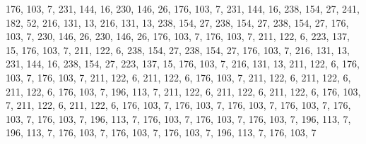 176, 103, 7, 231, 144, 16, 230, 146, 26, 176, 103, 7, 231, 144, 16, 238,
154, 27, 241, 182, 52, 216, 131, 13, 216, 131, 13, 238, 154, 27, 238, 154,
27, 238, 154, 27, 176, 103, 7, 230, 146, 26, 230, 146, 26, 176, 103, 7,
176, 103, 7, 211, 122, 6, 223, 137, 15, 176, 103, 7, 211, 122, 6, 238,
154, 27, 238, 154, 27, 176, 103, 7, 216, 131, 13, 231, 144, 16, 238, 154,
27, 223, 137, 15, 176, 103, 7, 216, 131, 13, 211, 122, 6, 176, 103, 7,
176, 103, 7, 211, 122, 6, 211, 122, 6, 176, 103, 7, 211, 122, 6, 211,
122, 6, 211, 122, 6, 176, 103, 7, 196, 113, 7, 211, 122, 6, 211, 122,
6, 211, 122, 6, 176, 103, 7, 211, 122, 6, 211, 122, 6, 176, 103, 7,
176, 103, 7, 176, 103, 7, 176, 103, 7, 176, 103, 7, 176, 103, 7, 196,
113, 7, 176, 103, 7, 176, 103, 7, 176, 103, 7, 196, 113, 7, 196, 113,
7, 176, 103, 7, 176, 103, 7, 176, 103, 7, 196, 113, 7, 176, 103, 7
